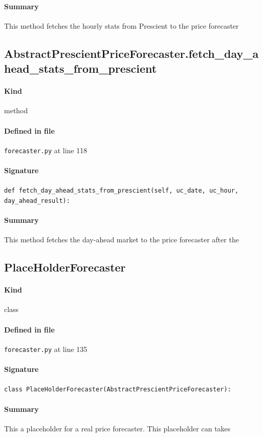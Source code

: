 \documentclass[11pt]{report}
\begin{document}
\paragraph{Summary} This method fetches the hourly stats from Prescient to the price forecaster
\subsection{AbstractPrescientPriceForecaster.fetch\_day\_ahead\_stats\_from\_prescient}
\label{def:forecaster.py:AbstractPrescientPriceForecaster.fetch_day_ahead_stats_from_prescient:L118}
\paragraph{Kind} method
\paragraph{Defined in file} \texttt{forecaster.py} at line 118
\paragraph{Signature} \texttt{def fetch\_day\_ahead\_stats\_from\_prescient(self, uc\_date, uc\_hour, day\_ahead\_result):}
\paragraph{Summary} This method fetches the day-ahead market to the price forecaster after the
\subsection{PlaceHolderForecaster}
\label{def:forecaster.py:PlaceHolderForecaster:L135}
\paragraph{Kind} class
\paragraph{Defined in file} \texttt{forecaster.py} at line 135
\paragraph{Signature} \texttt{class PlaceHolderForecaster(AbstractPrescientPriceForecaster):}
\paragraph{Summary} This a placeholder for a real price forecaster. This placeholder can takes
\end{document}
